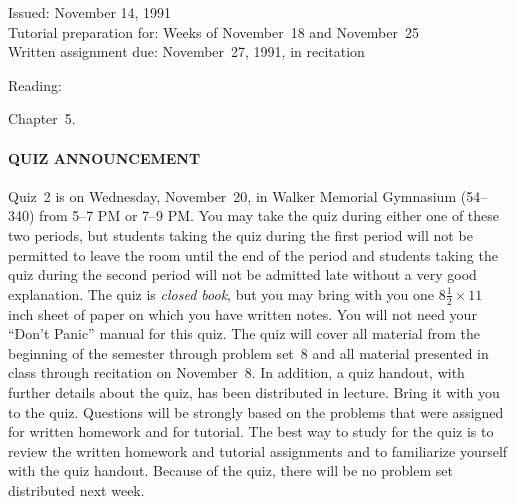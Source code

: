 
\def\bigfbox#1{%
  \vtop{\vbox{\hrule%
              \hbox{\vrule\kern3pt%
                    \vtop{\vbox{\kern3pt#1}\kern3pt}%
                    \kern3pt\vrule}}%
        \hrule}}




\medskip

\begin{flushleft}
Issued: November 14, 1991 \\
\smallskip
Tutorial preparation for: Weeks of November~18 and November~25 \\
Written assignment due:  November~27, 1991, in recitation \\
\end{flushleft}

\begin{flushleft}
Reading:
\begin{tightlist}

\item Chapter~5.

\end{tightlist}
\end{flushleft}

\paragraph{QUIZ ANNOUNCEMENT} Quiz~2 is on Wednesday, November~20, in Walker
Memorial Gymnasium (54--340) from 5--7 PM or 7--9 PM.  You may take the quiz
during either one of these two periods, but students taking the quiz during the
first period will not be permitted to leave the room until the end of the
period and students taking the quiz during the second period will not be
admitted late without a very good explanation.  The quiz is {\em closed book},
but you may bring with you one $8\frac{1}{2}\times 11$ inch sheet of paper on
which you have written notes.  You will not need your ``Don't Panic'' manual
for this quiz.  The quiz will cover all material from the beginning of the
semester through problem set~8 and all material presented in class through
recitation on November~8.  In addition, a quiz handout, with further details
about the quiz, has been distributed in lecture.  Bring it with you to the
quiz.  Questions will be strongly based on the problems that were assigned for
written homework and for tutorial.  The best way to study for the quiz is to
review the written homework and tutorial assignments and to familiarize
yourself with the quiz handout.  Because of the quiz, there will be no problem
set distributed next week.

